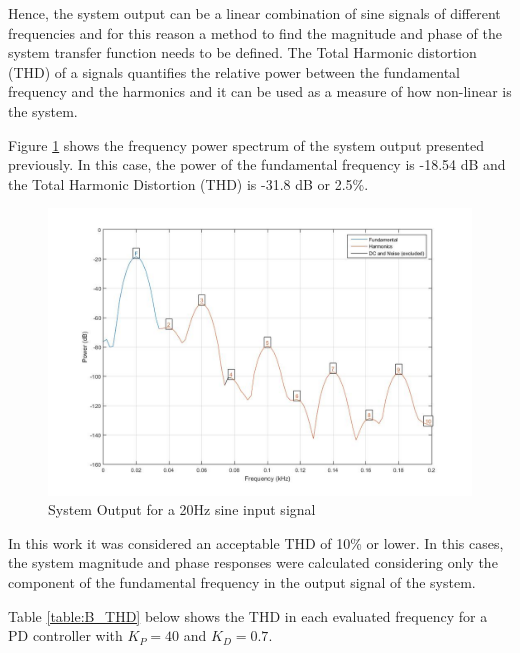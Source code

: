 Hence, the system output can be a linear combination of sine signals of different frequencies and for this reason a method to find the magnitude and phase of the system transfer function needs to be defined. The Total Harmonic distortion (THD) of a signals quantifies the relative power between the fundamental frequency and the harmonics and it can be used as a measure of how non-linear is the system. 

Figure \ref{fig:B_Spectrum} shows the frequency power spectrum of the system output presented previously. In this case, the power of the fundamental frequency is -18.54 dB and the Total Harmonic Distortion (THD) is -31.8 dB or 2.5\%.

\begin{figure}[H]
	\centering
	\centerline{\includegraphics[width=1.1\textwidth]{Figuras/B.NonlinearFR/THD20HZ.jpg}}
	\caption{System Output for a 20Hz sine input signal}
	\label{fig:B_Spectrum}
\end{figure}

In this work it was considered an acceptable THD of 10\% or lower. In this cases, the system magnitude and phase responses were calculated considering only the component of the fundamental frequency in the output signal of the system.

Table \ref{table:B_THD} below shows the THD in each evaluated frequency for a PD controller with $K_P=40$ and $K_D=0.7$.

